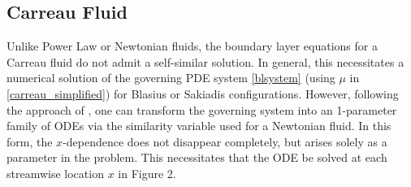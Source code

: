 \documentclass{article}
\begin{document}
\subsection{Carreau Fluid}

\hspace{\parindent} Unlike Power Law or Newtonian fluids, the boundary layer equations for a Carreau fluid do not admit a self-similar solution. In general, this necessitates a numerical solution of the governing PDE system \eqref{blsystem} (using $\mu$ in \eqref{carreau_simplified}) for Blasius or Sakiadis configurations. However, following the approach of \cite{Griffiths}, one can transform the governing system into an 1-parameter family of ODEs via the similarity variable used for a Newtonian fluid.  In this form, the $x$-dependence does not disappear completely, but arises solely as a parameter in the problem.  This necessitates that the ODE be solved at each streamwise location $x$ in Figure 2.
\end{document}
